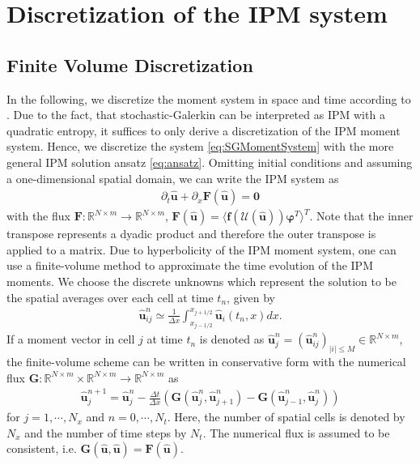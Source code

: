 \section{Discretization of the IPM system}
\label{sec:framework}
\subsection{Finite Volume Discretization}
In the following, we discretize the moment system in space and time according to \cite{kusch2017maximum}. Due to the fact, that stochastic-Galerkin can be interpreted as IPM with a quadratic entropy, it suffices to only derive a discretization of the IPM moment system. Hence, we discretize the system \eqref{eq:SGMomentSystem} with the more general IPM solution ansatz \eqref{eq:ansatz}.  
Omitting initial conditions and assuming a one-dimensional spatial domain, we can write the IPM system  as
\begin{align*}
\partial_t \bm{\hat u}+\partial_x \bm{F}(\bm{\hat u}) = \bm{0}
\end{align*}
with the flux $\bm{F}:\mathbb{R}^{N\times m}\to\mathbb{R}^{N\times m}$, $\bm{F}(\bm{\hat u})=\langle \bm f(\mathcal{U}(\bm{\hat u}))\bm{\varphi}^T \rangle^T$. Note that the inner transpose represents a dyadic product and therefore the outer transpose is applied to a matrix. Due to hyperbolicity of the IPM moment system, one can use a finite-volume method to approximate the time evolution of the IPM moments. We choose the discrete unknowns which represent the solution to be the spatial averages over each cell at time $t_n$, given by
\begin{align*}
\bm{\hat u}_{ij}^n \simeq \frac{1}{\Delta x}\int_{x_{j-1/ 2}}^{x_{j+1/ 2}}\bm{\hat u}_i(t_n,x) dx.
\end{align*}
If a moment vector in cell $j$ at time $t_n$ is denoted as $\bm{\hat u}_j^n = (\bm{\hat u}_{ij}^n)_{\vert i\vert\leq M}\in\mathbb{R}^{N\times m}$, the finite-volume scheme can be written in conservative form with the numerical flux $\bm{G}:\mathbb{R}^{N\times m}\times\mathbb{R}^{N\times m}\to\mathbb{R}^{N\times m}$ as
\begin{align}\label{eq:IPMDiscretization}
\bm{\hat u}_{j}^{n+1} = \bm{\hat u}_{j}^{n}  - \frac{\Delta t}{\Delta x}\left( \bm{G}(\bm{\hat u}_{j}^{n},\bm{\hat u}_{j+1}^{n})- \bm{G}(\bm{\hat u}_{j-1}^{n},\bm{\hat u}_{j}^{n})\right)
\end{align}
for $j = 1,\cdots,N_x$ and $n = 0,\cdots,N_t$. Here, the number of spatial cells is denoted by $N_x$ and the number of time steps by $N_t$.
The numerical flux is assumed to be consistent, i.e. $\bm{G}(\bm{\hat{u}},\bm{\hat{u}})=\bm{F}(\bm{\hat{u}})$.

